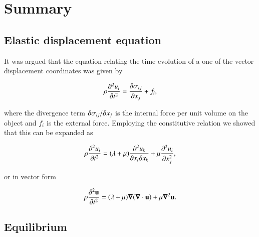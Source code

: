 % 
% 
% 
% 
% 
% 
% 
% 
% 
% 
% 
% 
\section{Summary}

\subsection{Elastic displacement equation}
It was argued that the equation relating the time evolution of a one of the vector displacement coordinates was given by

\begin{equation}\label{eqn:continuumElasticityReview:570}
\rho \PDSq{t}{u_i} = \PD{x_j}{\sigma_{ij}} + f_i,
\end{equation}

where the divergence term $\PDi{x_j}{\sigma_{ij}}$ is the internal force per unit volume on the object and $f_i$ is the external force.  Employing the constitutive relation we showed that this can be expanded as

\begin{equation}\label{eqn:continuumElasticityReview:590}
\rho \PDSq{t}{u_i} = (\lambda + \mu) \frac{\partial^2 u_k}{\partial x_i \partial x_k}
+ \mu
\frac{\partial^2 u_i}
{\partial x_j^2
},
\end{equation}

or in vector form

\begin{equation}\label{eqn:continuumElasticityReview:610}
\rho \PDSq{t}{\Bu} = (\lambda + \mu) \spacegrad (\spacegrad \cdot \Bu) + \mu \spacegrad^2 \Bu.
\end{equation}

\subsection{Equilibrium}

